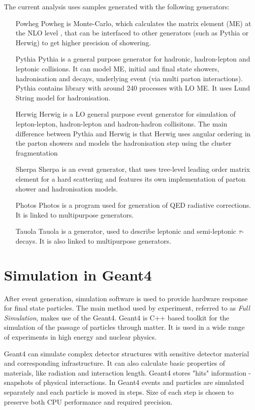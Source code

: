 The current analysis uses samples generated with the following generators:
\begin{itemize}[align=left]
\item[Powheg \cite{Powheg}] Powheg is Monte-Carlo, which calculates the matrix element (ME) at the NLO level \cite{PowhegNLO}, that can be interfaced to other generators (such as Pythia or Herwig) to get higher precision of showering.
\item[Pythia \cite{Pythia6}] Pythia is a general purpose generator for hadronic, hadron-lepton and leptonic collisions. It can model ME, initial and final state showers, hadronisation and decays, underlying event (via multi parton interactions). Pythia contains library with around 240 processes with LO ME. It uses Lund String model \cite{LundString} for hadronisation.
\item[Herwig \cite{Herwig}] Herwig is a LO general purpose event generator for simulation of lepton-lepton, hadron-lepton and hadron-hadron collisitons. The main difference between Pythia and Herwig is that Herwig uses angular ordering in the parton showers and models the hadronisation step using the cluster fragmentation
\item[Sherpa \cite{Sherpa}] Sherpa is an event generator, that uses tree-level leading order matrix element for a hard scattering and features its own implementation of parton shower and hadronisation models.
\item[Photos \cite{Photos}] Photos is a program used for generation of QED radiative corrections. It is linked to multipurpose generators.
\item[Tauola \cite{taluola}] Tauola is a generator, used to describe leptonic and semi-leptonic $\tau$-decays. It is also linked to multipurpose generators.
\end{itemize}

\section{Simulation in Geant4}

After event generation, simulation software is used to provide hardware response for final state particles. The main method used by \atlas experiment, referred to as \textit{Full Simulation}, makes use of the Geant4\cite{Geant4}. Geant4 is C++ based toolkit for the simulation of the passage of particles through matter. It is used in a wide range of experiments in high energy and nuclear physics.

Geant4 can simulate complex detector structures with sensitive detector material and corresponding infrastructure. It can also calculate basic properties of materials, like radiation and interaction length. Geant4 stores "hits" information  - snapshots of physical interactions. 
In Geant4 events and particles are simulated separately and each particle is moved in steps. Size of each step is chosen to preserve both CPU performance and required precision. 

